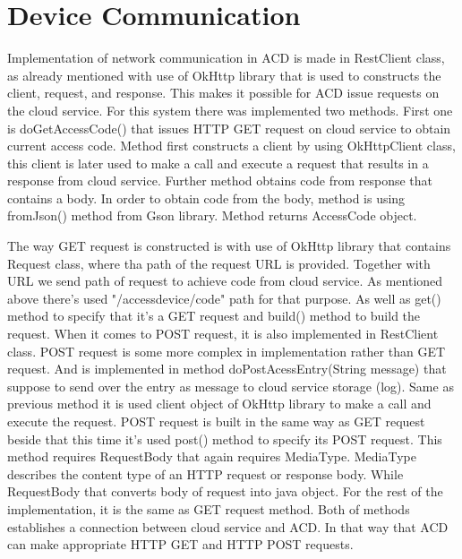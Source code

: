 \newpage
\section{Device Communication}
\label{sec:device_communication}

Implementation of network communication in ACD is made in RestClient class, as already mentioned with use of OkHttp library that is used to constructs the client, request, and response. This makes it possible for ACD issue requests on the cloud service. For this system there was implemented two methods. First one is doGetAccessCode() that issues HTTP GET request on cloud service to obtain current access code. Method first constructs a client by using OkHttpClient class, this client is later used to make a call and execute a request that results in a response from cloud service. Further method obtains code from response that contains a body. In order to obtain code from the body, method is using fromJson() method from Gson library. Method returns AccessCode object. 

The way GET request is constructed is with use of OkHttp library that contains Request class, where tha path of the request URL is provided. Together with URL we send path of request to achieve code from cloud service. As mentioned above there’s used "/accessdevice/code" path for that purpose. As well as get() method to specify that it’s a GET request and build() method to build the request. 
\newline When it comes to POST request, it is also implemented in RestClient class. POST request is some more complex in implementation rather than GET request. And is implemented in method doPostAcessEntry(String message) that suppose to send over the entry as message to cloud service storage (log). Same as previous method it is used client object of OkHttp library to make a call and execute the request. 
POST request is built in the same way as GET request beside that this time it’s used post() method to specify its POST request. This method requires RequestBody that again requires MediaType. MediaType describes the content type of an HTTP request or response body. While RequestBody that converts body of request into java object. For the rest of the implementation, it is the same as GET request method. Both of methods establishes a connection between cloud service and ACD. In that way that ACD can make appropriate HTTP GET and HTTP POST requests. 
